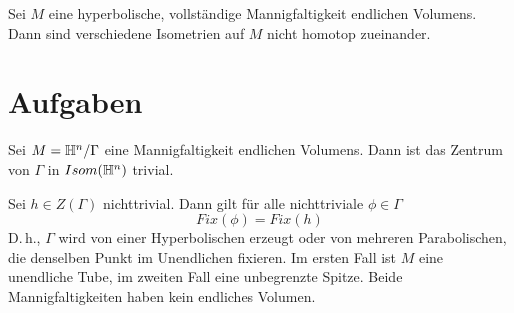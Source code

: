 \documentclass{book}
\begin{document}
\Kor{}
Sei $M$ eine hyperbolische, vollständige Mannigfaltigkeit endlichen Volumens. Dann sind verschiedene Isometrien auf $M$ nicht homotop zueinander.

\chapter{Aufgaben}
\Lem{}
Sei $M = \mathbb{H}^n / \Gamma$ eine Mannigfaltigkeit endlichen Volumens. Dann ist das Zentrum von $\Gamma$ in $Isom(\mathbb{H}^n)$ trivial.
\begin{Beweis}{}
	Sei $h \in Z(\Gamma)$ nichttrivial. Dann gilt für alle nichttriviale $\phi \in \Gamma$
	\[ Fix(\phi) = Fix(h) \]
	D.\,h., $\Gamma$ wird von einer Hyperbolischen erzeugt oder von mehreren Parabolischen, die denselben Punkt im Unendlichen fixieren. Im ersten Fall ist $M$ eine unendliche Tube, im zweiten Fall eine unbegrenzte Spitze. Beide Mannigfaltigkeiten haben kein endliches Volumen.
\end{Beweis}



\printindex
\end{document}
